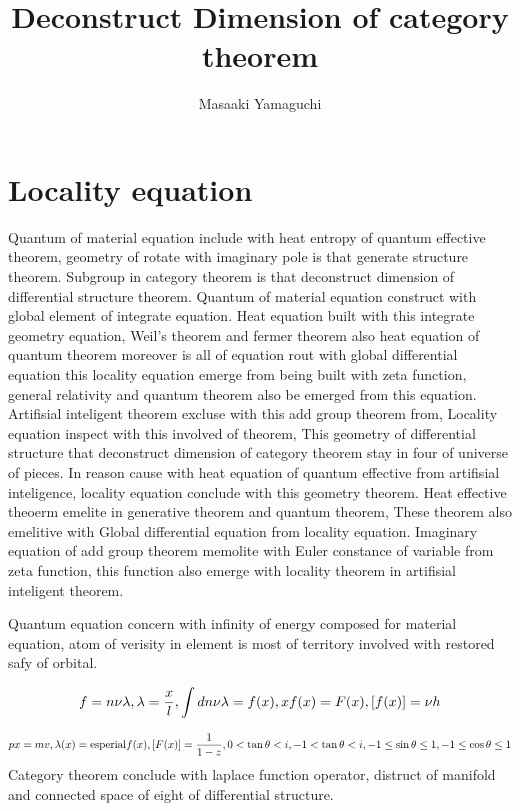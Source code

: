 \documentclass{jsarticle}
\begin{document}
\title{Deconstruct Dimension of category theorem}
\author{Masaaki Yamaguchi}
\date{}
\maketitle



\section{Locality equation}
  Quantum of material equation include with heat entropy of quantum effective theorem,
geometry of rotate with imaginary pole is that generate structure theorem.
Subgroup in category theorem is that deconstruct dimension of differential structure theorem.
Quantum of material equation construct with global element of integrate equation.
Heat equation built with this integrate geometry equation,
Weil's theorem and fermer theorem also heat equation of quantum theorem moreover is
all of equation rout with global differential equation
this locality equation emerge from being built with zeta function,
general relativity and quantum theorem also be emerged from this equation.
Artifisial inteligent theorem excluse with this add group theorem from,
Locality equation inspect with this involved of theorem,
This geometry of differential structure that deconstruct dimension of category theorem
stay in four of universe of pieces.
In reason cause with heat equation of quantum effective from artifisial inteligence,
locality equation conclude with this geometry theorem.
Heat effective theoerm emelite in generative theorem and quantum theorem,
These theorem also emelitive with Global differential equation from locality equation.
Imaginary equation of add group theorem memolite with Euler constance of variable from zeta function, 
this function also emerge with locality theorem in artifisial inteligent theorem.

 Quantum equation concern with infinity of energy composed for material equation, atom of verisity in element is most of territory
involved with restored safy of orbital.


$$ f = n\nu\lambda , \lambda = {x \over l},
 \int dn \nu \lambda = f(x), 
 xf(x) = F(x),
 [f(x)] = \nu h$$

$$ px = mv,  \lambda (x) = \mathrm{esperial} f(x), 
 [F(x)] = {1 \over {1 - z}}, 
 0 <  \tan \theta < i, -1 < \tan \theta < i, 
 -1 \le \sin \theta \le 1, 
 -1 \le \cos \theta \le 1 $$
  Category theorem conclude with laplace function operator, distruct of manifold
and connected space of eight of differential structure.
\end{document}
